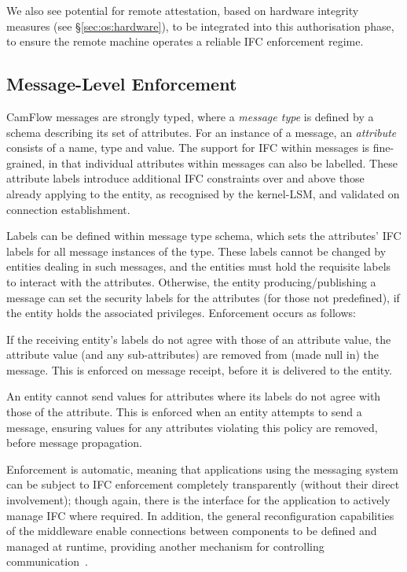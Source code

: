 \documentclass[10pt,journal,compsoc]{IEEEtran}
\begin{document}
We also see potential for remote attestation, based on hardware integrity measures (see \S\ref{sec:os:hardware}), to be integrated into this authorisation phase, to ensure the remote machine operates a reliable IFC enforcement regime.



\subsection{Message-Level Enforcement}




CamFlow messages are strongly typed, where a {\em message type} is defined by a schema describing its set of attributes. 
For an instance of a message, an {\em attribute} consists of a name, type and value. 
 The support for IFC within messages is fine-grained, in that individual attributes within messages can also be labelled. These attribute labels introduce additional IFC constraints over and above those already applying to the entity, \ie as recognised by the kernel-LSM, and validated on connection establishment.


Labels can be defined within message type schema, which sets the attributes' IFC labels for all message instances of the type. These labels cannot be changed by entities dealing in such messages, and the entities must hold the requisite labels to interact with the attributes. 
Otherwise, the entity producing/publishing a message can set the security labels for the attributes (for those not predefined), if the entity holds the associated privileges.  
Enforcement occurs as follows:

 If the receiving entity's labels do not agree with those of an attribute value, the attribute value (and any sub-attributes) are removed from (made {\small \textsf {null}} in) the message.
This is enforced on message receipt, before it is delivered to the entity.

 An entity cannot send values for attributes where its labels do not agree with those of the attribute.
This is enforced when an entity attempts to send a message, ensuring values for any attributes violating this policy are removed, before message propagation.


Enforcement is automatic, meaning that applications using the messaging system can be subject to IFC enforcement completely transparently (\ie without their direct involvement); though again, there is the interface for the application to
actively manage IFC where required.
In addition, the general reconfiguration capabilities of the middleware enable connections between components to be defined and managed at runtime, providing another mechanism for controlling communication~\cite{debs14SBUStutorial}.
\end{document}
